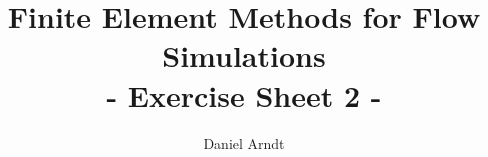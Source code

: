 \documentclass[12pt]{article}
\newcommand{\bv}{\boldsymbol{v}}
\newenvironment{exercise}[2][Exercise]{\begin{trivlist}
\item[\hskip \labelsep {\bfseries #1}\hskip \labelsep {\bfseries #2.}]}{\end{trivlist}}
\begin{document}
 
\title{Finite Element Methods for Flow Simulations\\ - Exercise Sheet 2 -}
\author{Daniel Arndt}
\date{}
 
\maketitle

\end{document}
